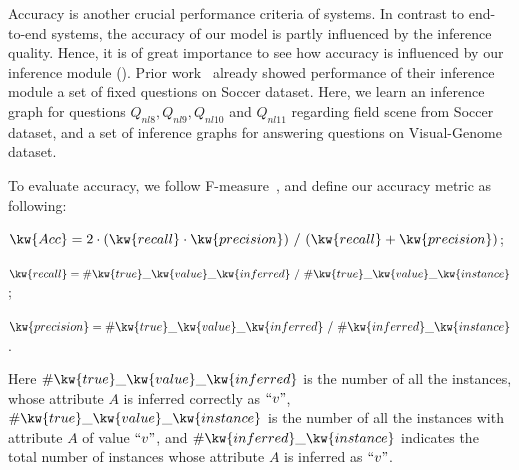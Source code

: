 Accuracy is another crucial performance criteria of \vqa systems. In contrast to end-to-end systems, the accuracy of our model is partly influenced by the inference quality. Hence, it is of great importance to see how accuracy is influenced by our inference module (). Prior work~\cite{peixi2019} already showed performance of their inference module \wrt a set of fixed questions on Soccer dataset. Here, we learn an inference graph for questions $Q_{nl8},Q_{nl9},Q_{nl10}$ and $Q_{nl11}$ regarding field scene from Soccer dataset, and a set of inference graphs for answering questions on Visual-Genome dataset. 

To evaluate accuracy, we follow F-measure~\cite{Fmeasure}, and define our accuracy metric as following:


\noindent $\kw{Acc}=2\cdot (\kw{recall}\cdot \kw{precision})~/~(\kw{recall}+\kw{precision})$;

\noindent $\kw{recall}=\#\kw{true}\_\kw{value}\_\kw{inferred}~/~\#\kw{true}\_\kw{value}\_\kw{instance}$;

\noindent $\kw{precision}=\#\kw{true}\_\kw{value}\_\kw{inferred}~/~\#\kw{inferred}\_\kw{instance}$.


Here $\#\kw{true}\_\kw{value}\_\kw{inferred}$ is the number of all the instances, whose attribute $A$ is inferred correctly as $``v"$,  $\#\kw{true}\_\kw{value}\_\kw{instance}$ is the number of all the instances with attribute $A$ of value $``v"$, and $\#\kw{inferred}\_\kw{instance}$ indicates the total number of instances whose attribute $A$ is inferred as $``v"$. 


